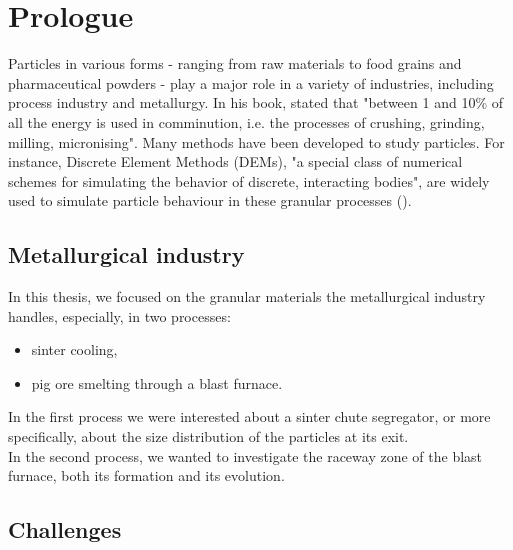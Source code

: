 
\chapter{Prologue}
\label{cap:prologue}

Particles in various forms - ranging from raw materials to food grains and pharmaceutical powders - 
play a major role in a variety of industries, including process industry and metallurgy. 
In his book, \citet{RefWorks:117} stated that "between 1 and 10\% of all the energy is used in 
comminution, i.e. the processes of crushing, grinding, milling, micronising". 
Many methods have been developed to study particles.
For instance, Discrete Element Methods (\acs{DEMs}), "a special class of numerical
schemes for simulating the behavior of discrete, interacting bodies", are widely used to 
simulate particle behaviour in these granular processes
(\citet{RefWorks:130}).\\ 

\section{Metallurgical industry}
\label{sec:metallurgical industry}
In this thesis, we focused on the granular materials the metallurgical industry
handles, especially, in two processes:
\begin{itemize}
  \item{sinter cooling,}
  \item{pig ore smelting through a blast furnace.} 
\end{itemize} 

In the first process we were interested about a sinter chute
segregator, or more specifically, about the size distribution of the particles
at its exit.\\
In the second process, we wanted to investigate the raceway zone of the blast
furnace, both its formation and its evolution.

\section{Challenges}
\label{sec:challenges}

